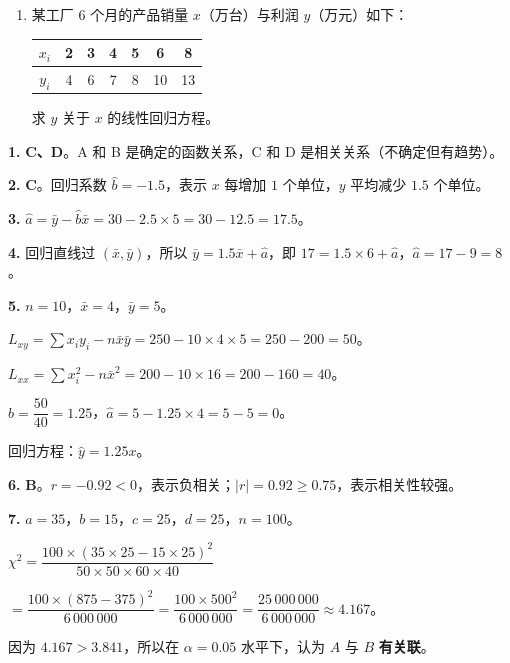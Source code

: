 \documentclass[12pt, a4paper]{ctexart}
\begin{document}
\begin{enumerate}
  \item 某工厂 $6$ 个月的产品销量 $x$（万台）与利润 $y$（万元）如下：
  \begin{center}
  \begin{tabular}{c|cccccc}
  \toprule
  $x_i$ & 2 & 3 & 4 & 5 & 6 & 8 \\
  \midrule
  $y_i$ & 4 & 6 & 7 & 8 & 10 & 13 \\
  \bottomrule
  \end{tabular}
  \end{center}
  求 $y$ 关于 $x$ 的线性回归方程。
\end{enumerate}

\vspace{20pt}

\begin{knowledgebox}[参考答案]
\textbf{1.} \textbf{C、D}。A 和 B 是确定的函数关系，C 和 D 是相关关系（不确定但有趋势）。

\medskip
\textbf{2.} \textbf{C}。回归系数 $\hat{b}=-1.5$，表示 $x$ 每增加 $1$ 个单位，$y$ 平均减少 $1.5$ 个单位。

\medskip
\textbf{3.} $\hat{a} = \bar{y} - \hat{b}\bar{x} = 30 - 2.5\times5 = 30 - 12.5 = \boxed{17.5}$。

\medskip
\textbf{4.} 回归直线过 $(\bar{x}, \bar{y})$，所以 $\bar{y} = 1.5\bar{x} + \hat{a}$，即 $17 = 1.5\times6 + \hat{a}$，$\hat{a} = 17 - 9 = \boxed{8}$。

\medskip
\textbf{5.} $n = 10$，$\bar{x} = 4$，$\bar{y} = 5$。

$L_{xy} = \sum x_iy_i - n\bar{x}\bar{y} = 250 - 10\times4\times5 = 250 - 200 = 50$。

$L_{xx} = \sum x_i^2 - n\bar{x}^2 = 200 - 10\times16 = 200 - 160 = 40$。

$\hat{b} = \dfrac{50}{40} = 1.25$，$\hat{a} = 5 - 1.25\times4 = 5 - 5 = 0$。

回归方程：$\boxed{\hat{y} = 1.25x}$。

\medskip
\textbf{6.} \textbf{B}。$r = -0.92 < 0$，表示负相关；$|r| = 0.92 \geqslant 0.75$，表示相关性较强。

\medskip
\textbf{7.} $a=35$，$b=15$，$c=25$，$d=25$，$n=100$。

$\chi^2 = \dfrac{100\times(35\times25 - 15\times25)^2}{50\times50\times60\times40}$

$= \dfrac{100\times(875-375)^2}{6\,000\,000} = \dfrac{100\times500^2}{6\,000\,000} = \dfrac{25\,000\,000}{6\,000\,000} \approx 4.167$。

因为 $4.167 > 3.841$，所以在 $\alpha=0.05$ 水平下，认为 $A$ 与 $B$ \textbf{有关联}。


\end{knowledgebox}
\end{document}
